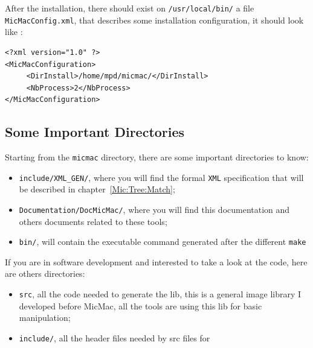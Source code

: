 After the installation, there should exist on {\tt /usr/local/bin/} a file
{\tt MicMacConfig.xml}, that describes some installation configuration,
it should look like :

\label{Mic:File:Config}

\begin{verbatim}
<?xml version="1.0" ?>
<MicMacConfiguration>
     <DirInstall>/home/mpd/micmac/</DirInstall>
     <NbProcess>2</NbProcess>
</MicMacConfiguration>
\end{verbatim}



\subsection{Some Important Directories}

Starting from the {\tt micmac} directory, there are some important directories
to know:

\begin{itemize}
   \item {\tt include/XML\_GEN/}, where you will find the formal {\tt XML} specification that will
         be described in chapter~\ref{Mic:Tree:Match};

   \item {\tt Documentation/DocMicMac/}, where you will find this documentation and others
        documents related to these tools;

   \item {\tt bin/}, will contain the executable command generated  after the different {\tt make}
\end{itemize}


If you are in software development and interested to take a look at the code,
here are others directories:


\begin{itemize}
   \item {\tt src}, all the \CPP code needed to generate the \ELISE lib, this is a general image library
         I developed before MicMac, all the tools are using this lib for basic manipulation;

   \item {\tt include/}, all the header files needed by src files for \ELISE
\end{itemize}




